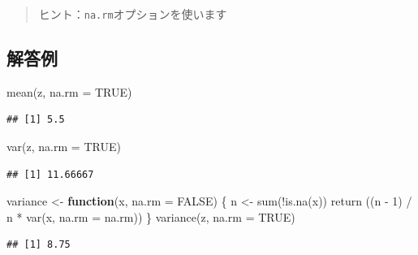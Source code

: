 \documentclass[
  12pt,
]{book}
\newenvironment{Shaded}{\begin{snugshade}}{\end{snugshade}}
\newcommand{\AttributeTok}[1]{\textcolor[rgb]{0.77,0.63,0.00}{#1}}
\newcommand{\ConstantTok}[1]{\textcolor[rgb]{0.00,0.00,0.00}{#1}}
\newcommand{\ControlFlowTok}[1]{\textcolor[rgb]{0.13,0.29,0.53}{\textbf{#1}}}
\newcommand{\DecValTok}[1]{\textcolor[rgb]{0.00,0.00,0.81}{#1}}
\newcommand{\FunctionTok}[1]{\textcolor[rgb]{0.00,0.00,0.00}{#1}}
\newcommand{\NormalTok}[1]{#1}
\newcommand{\OtherTok}[1]{\textcolor[rgb]{0.56,0.35,0.01}{#1}}
\newcommand{\SpecialCharTok}[1]{\textcolor[rgb]{0.00,0.00,0.00}{#1}}
\begin{document}
\begin{quote}
ヒント：\texttt{na.rm}オプションを使います
\end{quote}

\hypertarget{ux89e3ux7b54ux4f8b-1}{%
\subsection*{解答例}\label{ux89e3ux7b54ux4f8b-1}}

\begin{Shaded}
\begin{Highlighting}[numbers=left,,]
\FunctionTok{mean}\NormalTok{(z, }\AttributeTok{na.rm =} \ConstantTok{TRUE}\NormalTok{)}
\end{Highlighting}
\end{Shaded}

\begin{verbatim}
## [1] 5.5
\end{verbatim}

\begin{Shaded}
\begin{Highlighting}[numbers=left,,]
\FunctionTok{var}\NormalTok{(z, }\AttributeTok{na.rm =} \ConstantTok{TRUE}\NormalTok{)}
\end{Highlighting}
\end{Shaded}

\begin{verbatim}
## [1] 11.66667
\end{verbatim}

\begin{Shaded}
\begin{Highlighting}[numbers=left,,]
\NormalTok{variance }\OtherTok{\textless{}{-}} \ControlFlowTok{function}\NormalTok{(x, }\AttributeTok{na.rm =} \ConstantTok{FALSE}\NormalTok{) \{}
\NormalTok{  n }\OtherTok{\textless{}{-}} \FunctionTok{sum}\NormalTok{(}\SpecialCharTok{!}\FunctionTok{is.na}\NormalTok{(x))}
  \FunctionTok{return}\NormalTok{ ((n }\SpecialCharTok{{-}} \DecValTok{1}\NormalTok{) }\SpecialCharTok{/}\NormalTok{ n }\SpecialCharTok{*} \FunctionTok{var}\NormalTok{(x, }\AttributeTok{na.rm =}\NormalTok{ na.rm))}
\NormalTok{\}}
\FunctionTok{variance}\NormalTok{(z, }\AttributeTok{na.rm =} \ConstantTok{TRUE}\NormalTok{)}
\end{Highlighting}
\end{Shaded}

\begin{verbatim}
## [1] 8.75
\end{verbatim}
\end{document}
